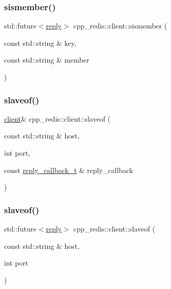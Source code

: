\mbox{\label{classcpp__redis_1_1client_af4ba6bfa37b81759324c726ef77acdbc}} 
\subsubsection{\texorpdfstring{sismember()}{sismember()}\hspace{0.1cm}{\footnotesize\ttfamily [2/2]}}
{\footnotesize\ttfamily std\+::future$<$\hyperlink{classcpp__redis_1_1reply}{reply}$>$ cpp\+\_\+redis\+::client\+::sismember (\begin{DoxyParamCaption}\item[{const std\+::string \&}]{key,  }\item[{const std\+::string \&}]{member }\end{DoxyParamCaption})}

\mbox{\label{classcpp__redis_1_1client_a5a8ff87da211196ca80a7c4badb0c378}} 
\subsubsection{\texorpdfstring{slaveof()}{slaveof()}\hspace{0.1cm}{\footnotesize\ttfamily [1/2]}}
{\footnotesize\ttfamily \hyperlink{classcpp__redis_1_1client}{client}\& cpp\+\_\+redis\+::client\+::slaveof (\begin{DoxyParamCaption}\item[{const std\+::string \&}]{host,  }\item[{int}]{port,  }\item[{const \hyperlink{classcpp__redis_1_1client_a061a1140d36d2eaeda82b09a0bb3f9f2}{reply\+\_\+callback\+\_\+t} \&}]{reply\+\_\+callback }\end{DoxyParamCaption})}

\mbox{\label{classcpp__redis_1_1client_a1731c94f72a209ffcba25767b8cab386}} 
\subsubsection{\texorpdfstring{slaveof()}{slaveof()}\hspace{0.1cm}{\footnotesize\ttfamily [2/2]}}
{\footnotesize\ttfamily std\+::future$<$\hyperlink{classcpp__redis_1_1reply}{reply}$>$ cpp\+\_\+redis\+::client\+::slaveof (\begin{DoxyParamCaption}\item[{const std\+::string \&}]{host,  }\item[{int}]{port }\end{DoxyParamCaption})}

